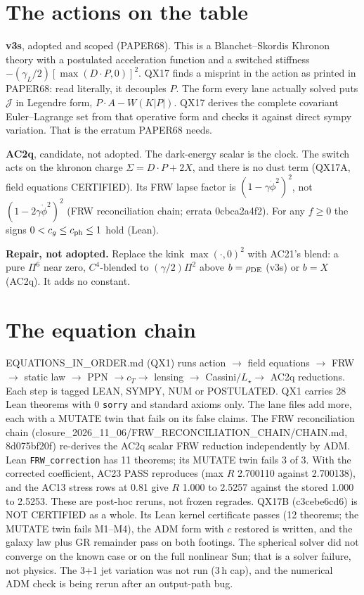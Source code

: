 \documentclass[10pt]{article}
\begin{document}
\section{The actions on the table}
\textbf{v3s}, adopted and scoped (PAPER68). This is a Blanchet--Skordis Khronon theory with a postulated acceleration function and a switched stiffness $-(\gamma_L/2)[\max(D\!\cdot\!P,0)]^2$.
QX17 finds a misprint in the action as printed in PAPER68: read literally, it decouples $P$. The form every lane actually solved puts $\mathcal J$ in Legendre form, $P\!\cdot\!A-W(K|P|)$. QX17 derives the complete covariant Euler--Lagrange set from that operative form and checks it against direct sympy variation. That is the erratum PAPER68 needs.

\textbf{AC2q}, candidate, not adopted. The dark-energy scalar is the clock. The switch acts on the khronon charge $\Sigma=D\!\cdot\!P+2X$, and there is no dust term (QX17A, field equations CERTIFIED). Its FRW lapse factor is $(1-\gamma\dot\phi^2)^2$, not $(1-2\gamma\dot\phi^2)^2$ (FRW reconciliation chain; errata 0cbca2a4f2). For any $f\ge0$ the signs $0<c_g\le c_{\rm ph}\le1$ hold (Lean).

\textbf{Repair, not adopted.} Replace the kink $\max(\cdot,0)^2$ with AC21's blend: a pure $\Pi^6$ near zero, $C^4$-blended to $(\gamma/2)\Pi^2$ above $b=\rho_{\rm DE}$ (v3s) or $b=X$ (AC2q). It adds no constant.

\section{The equation chain}
EQUATIONS\_IN\_ORDER.md (QX1) runs action $\to$ field equations $\to$ FRW $\to$ static law $\to$ PPN $\to c_T\to$ lensing $\to$ Cassini$/L_\star\to$ AC2q reductions. Each step is tagged LEAN, SYMPY, NUM or POSTULATED. QX1 carries 28 Lean theorems with 0 \texttt{sorry} and standard axioms only. The lane files add more, each with a MUTATE twin that fails on its false claims. The FRW reconciliation chain (closure\_2026\_11\_06/FRW\_RECONCILIATION\_CHAIN/CHAIN.md, 8d075bf20f) re-derives the AC2q scalar FRW reduction independently by ADM. Lean \texttt{FRW\_correction} has 11 theorems; its MUTATE twin fails 3 of 3. With the corrected coefficient, AC23 PASS reproduces (max $R$ 2.700110 against 2.700138), and the AC13 stress rows at 0.81 give $R$ 1.000 to 2.5257 against the stored 1.000 to 2.5253. These are post-hoc reruns, not frozen regrades. QX17B (c3cebe6cd6) is NOT CERTIFIED as a whole. Its Lean kernel certificate passes (12 theorems; the MUTATE twin fails M1--M4), the ADM form with $c$ restored is written, and the galaxy law plus GR remainder pass on both footings. The spherical solver did not converge on the known case or on the full nonlinear Sun; that is a solver failure, not physics. The 3+1 jet variation was not run (3\,h cap), and the numerical ADM check is being rerun after an output-path bug.
\end{document}

